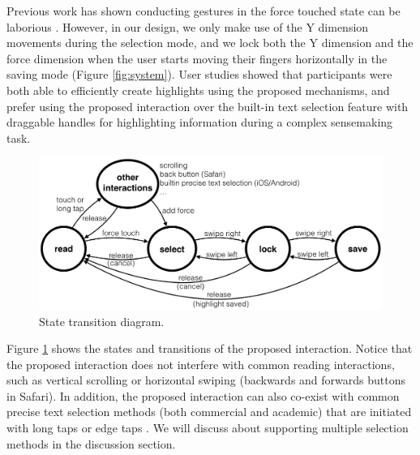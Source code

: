 Previous work has shown conducting gestures in the force touched state can be laborious \cite{Lee:2014:DIT:2686612.2686702}. However, in our design, we only make use of the Y dimension movements during the selection mode, and we lock both the Y dimension and the  force dimension when the user starts moving their fingers horizontally in the saving mode (Figure \ref{fig:system}). User studies showed that participants were both able to efficiently create highlights using the proposed mechanisms, and prefer using the proposed interaction over the built-in text selection feature with draggable handles for highlighting information during a complex sensemaking task.
 

\begin{figure}[ht]
    \centering
    \includegraphics[width=0.8\columnwidth]{Chapters/Highlight/img/states.png}
    \caption[State transition diagram for the uncertain highlighting interaction technique.]{State transition diagram.}
    \label{fig:states}
\end{figure}



Figure \ref{fig:states} shows the states and transitions of the proposed interaction. Notice that the proposed interaction does not interfere with common reading interactions, such as vertical scrolling or horizontal swiping (backwards and forwards buttons in Safari). In addition, the proposed interaction can also co-exist with common precise text selection methods (both commercial and academic) that are initiated with long taps or edge taps \cite{chen2014bezelcopy}. We will discuss about supporting multiple selection methods in the discussion section.

